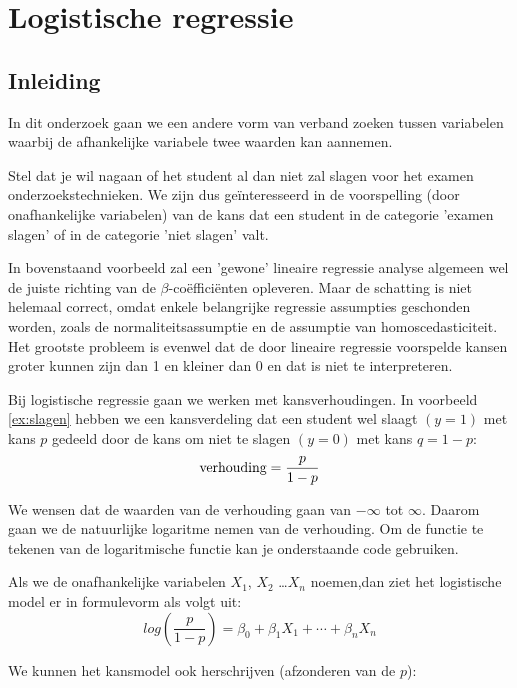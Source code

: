 \chapter{Logistische regressie}
\label{app:logistische-regressie}

\section{Inleiding}

In dit onderzoek gaan we een andere vorm van verband zoeken tussen variabelen waarbij de afhankelijke variabele twee waarden kan aannemen. 

\begin{example}
	\label{ex:slagen}
	Stel dat je wil nagaan of het student al dan niet zal slagen voor het examen onderzoekstechnieken. We zijn dus ge\"interesseerd in de voorspelling (door
	onafhankelijke variabelen) van de kans dat een student in de categorie 'examen slagen' of in de categorie 'niet slagen' valt. 
\end{example}

In bovenstaand voorbeeld zal een 'gewone' lineaire regressie analyse 
algemeen wel de juiste richting van de $\beta$-co\"efficiënten opleveren. Maar de schatting is niet helemaal correct, omdat enkele belangrijke regressie assumpties geschonden worden, zoals de normaliteitsassumptie en de assumptie van homoscedasticiteit. Het grootste probleem is evenwel dat de door lineaire regressie voorspelde kansen groter kunnen zijn dan 1 en kleiner dan 0 en dat is niet te interpreteren.

Bij logistische regressie gaan we werken met kansverhoudingen. In voorbeeld \ref{ex:slagen} hebben we een kansverdeling dat een student wel slaagt $(y = 1)$ met kans $p$ gedeeld door de kans om niet te slagen $(y=0)$ met kans $q = 1-p$:
\[ 
	\textnormal{verhouding} = \frac{p}{1-p}
\]

We wensen dat de waarden van de verhouding gaan van $- \infty$ tot $\infty$. Daarom gaan we de natuurlijke logaritme nemen van de verhouding. Om de functie te tekenen van de logaritmische functie kan je onderstaande code gebruiken. 



Als we de onafhankelijke variabelen $X_1$, $X_2$  \dots $X_n$ noemen,dan ziet het logistische model er in formulevorm als volgt uit:
\[ 
	log(\frac{p}{1-p}) = \beta_0 + \beta_1 X_1 + \cdots + \beta_n X_n 
\]

We kunnen het kansmodel ook herschrijven (afzonderen van de $p$):

